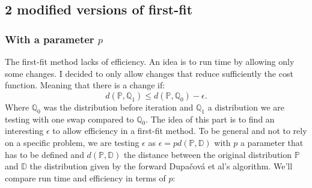 \documentclass{amsart}
\begin{document}
\subsection{2 modified versions of first-fit}
\subsubsection{With a parameter $p$}
The first-fit method lacks of efficiency. An idea is to run time by allowing only some changes. I decided to only allow changes that reduce sufficiently the cost function. Meaning that there is a change if: $$
d\left(\mathbb{P},\mathbb{Q}_1\right) \leq d\left(\mathbb{P},\mathbb{Q}_0\right) - \epsilon.
$$
Where $\mathbb{Q}_0$ was the distribution before iteration and $\mathbb{Q}_1$ a distribution we are testing with one swap compared to $\mathbb{Q}_0$. The idea of this part is to find an interesting $\epsilon$ to allow efficiency in a first-fit method. To be general and not to rely on a specific problem, we are testing $\epsilon$ as $\epsilon=pd\left(\mathbb{P},\mathbb{D}\right)$ with $p$ a parameter that has to be defined and $d\left(\mathbb{P},\mathbb{D}\right)$ the distance between the original distribution $\mathbb{P}$ and $\mathbb{D}$ the distribution given by the forward Dupačová et al's algorithm. We'll compare run time and efficiency in terms of $p$:
\end{document}
